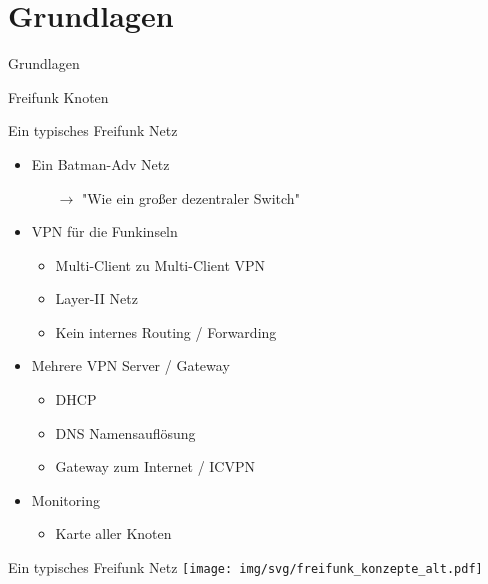 \section{Grundlagen}
\begin{frame}{}
    \begin{center}
        Grundlagen
     \end{center}
\end{frame}

\begin{frame}{Freifunk Knoten}
\end{frame}

\begin{frame}{Ein typisches Freifunk Netz}
    \begin{itemize}
        \item Ein Batman-Adv Netz
        \begin{itemize}
            \item[$\rightarrow$] "Wie ein großer dezentraler Switch"
        \end{itemize}
        \item VPN für die Funkinseln
        \begin{itemize}
            \item Multi-Client zu Multi-Client VPN
            \item Layer-II Netz
            \item Kein internes Routing / Forwarding
        \end{itemize}
        \item Mehrere VPN Server / Gateway
        \begin{itemize}
            \item DHCP
            \item DNS Namensauflösung
            \item Gateway zum Internet / ICVPN
        \end{itemize}
        \item Monitoring
        \begin{itemize}
            \item Karte aller Knoten
        \end{itemize}
    \end{itemize}
\end{frame}

\begin{frame}{Ein typisches Freifunk Netz}
    \texttt{[image: img/svg/freifunk\_konzepte\_alt.pdf]}
\end{frame}

